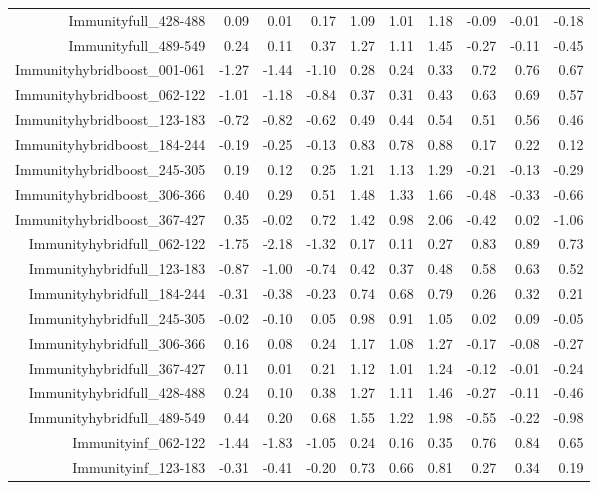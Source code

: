 \begin{table}[ht]
\begin{tabular}{rrrrrrrrrr}
  Immunityfull\_428-488 & 0.09 & 0.01 & 0.17 & 1.09 & 1.01 & 1.18 & -0.09 & -0.01 & -0.18 \\ 
  Immunityfull\_489-549 & 0.24 & 0.11 & 0.37 & 1.27 & 1.11 & 1.45 & -0.27 & -0.11 & -0.45 \\ 
  Immunityhybridboost\_001-061 & -1.27 & -1.44 & -1.10 & 0.28 & 0.24 & 0.33 & 0.72 & 0.76 & 0.67 \\ 
  Immunityhybridboost\_062-122 & -1.01 & -1.18 & -0.84 & 0.37 & 0.31 & 0.43 & 0.63 & 0.69 & 0.57 \\ 
  Immunityhybridboost\_123-183 & -0.72 & -0.82 & -0.62 & 0.49 & 0.44 & 0.54 & 0.51 & 0.56 & 0.46 \\ 
  Immunityhybridboost\_184-244 & -0.19 & -0.25 & -0.13 & 0.83 & 0.78 & 0.88 & 0.17 & 0.22 & 0.12 \\ 
  Immunityhybridboost\_245-305 & 0.19 & 0.12 & 0.25 & 1.21 & 1.13 & 1.29 & -0.21 & -0.13 & -0.29 \\ 
  Immunityhybridboost\_306-366 & 0.40 & 0.29 & 0.51 & 1.48 & 1.33 & 1.66 & -0.48 & -0.33 & -0.66 \\ 
  Immunityhybridboost\_367-427 & 0.35 & -0.02 & 0.72 & 1.42 & 0.98 & 2.06 & -0.42 & 0.02 & -1.06 \\ 
  Immunityhybridfull\_062-122 & -1.75 & -2.18 & -1.32 & 0.17 & 0.11 & 0.27 & 0.83 & 0.89 & 0.73 \\ 
  Immunityhybridfull\_123-183 & -0.87 & -1.00 & -0.74 & 0.42 & 0.37 & 0.48 & 0.58 & 0.63 & 0.52 \\ 
  Immunityhybridfull\_184-244 & -0.31 & -0.38 & -0.23 & 0.74 & 0.68 & 0.79 & 0.26 & 0.32 & 0.21 \\ 
  Immunityhybridfull\_245-305 & -0.02 & -0.10 & 0.05 & 0.98 & 0.91 & 1.05 & 0.02 & 0.09 & -0.05 \\ 
  Immunityhybridfull\_306-366 & 0.16 & 0.08 & 0.24 & 1.17 & 1.08 & 1.27 & -0.17 & -0.08 & -0.27 \\ 
  Immunityhybridfull\_367-427 & 0.11 & 0.01 & 0.21 & 1.12 & 1.01 & 1.24 & -0.12 & -0.01 & -0.24 \\ 
  Immunityhybridfull\_428-488 & 0.24 & 0.10 & 0.38 & 1.27 & 1.11 & 1.46 & -0.27 & -0.11 & -0.46 \\ 
  Immunityhybridfull\_489-549 & 0.44 & 0.20 & 0.68 & 1.55 & 1.22 & 1.98 & -0.55 & -0.22 & -0.98 \\ 
  Immunityinf\_062-122 & -1.44 & -1.83 & -1.05 & 0.24 & 0.16 & 0.35 & 0.76 & 0.84 & 0.65 \\ 
  Immunityinf\_123-183 & -0.31 & -0.41 & -0.20 & 0.73 & 0.66 & 0.81 & 0.27 & 0.34 & 0.19 \\ 

\end{tabular}
\end{table}
